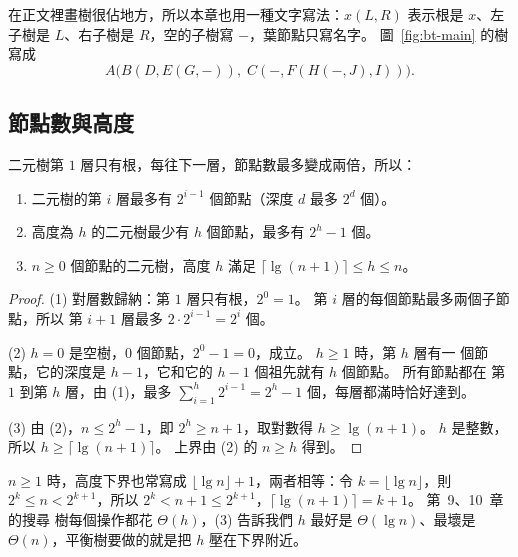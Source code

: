 \begin{center}
\label{fig:bt-main}
\end{center}

在正文裡畫樹很佔地方，所以本章也用一種文字寫法：$x(L, R)$ 表示根是 $x$、左子樹是
$L$、右子樹是 $R$，空的子樹寫 $-$，葉節點只寫名字。 圖~\ref{fig:bt-main} 的樹寫成
\[
A\bigl(B(D, E(G, -)),\; C(-, F(H(-, J), I))\bigr).
\]

\subsection{節點數與高度}

二元樹第 $1$ 層只有根，每往下一層，節點數最多變成兩倍，所以：

\begin{theorem}
\label{thm:bt-count}
\begin{enumerate}
\item 二元樹的第 $i$ 層最多有 $2^{i-1}$ 個節點（深度 $d$ 最多 $2^d$ 個）。
\item 高度為 $h$ 的二元樹最少有 $h$ 個節點，最多有 $2^h - 1$ 個。
\item $n \ge 0$ 個節點的二元樹，高度 $h$ 滿足
$\lceil \lg(n + 1) \rceil \le h \le n$。
\end{enumerate}
\end{theorem}

\begin{proof}
(1) 對層數歸納：第 $1$ 層只有根，$2^0 = 1$。 第 $i$ 層的每個節點最多兩個子節點，所以
第 $i + 1$ 層最多 $2 \cdot 2^{i-1} = 2^i$ 個。

(2) $h = 0$ 是空樹，$0$ 個節點，$2^0 - 1 = 0$，成立。 $h \ge 1$ 時，第 $h$ 層有一
個節點，它的深度是 $h - 1$，它和它的 $h - 1$ 個祖先就有 $h$ 個節點。 所有節點都在
第 $1$ 到第 $h$ 層，由 (1)，最多
$\sum_{i=1}^{h} 2^{i-1} = 2^h - 1$ 個，每層都滿時恰好達到。

(3) 由 (2)，$n \le 2^h - 1$，即 $2^h \ge n + 1$，取對數得 $h \ge \lg(n + 1)$。 $h$
是整數，所以 $h \ge \lceil \lg(n + 1) \rceil$。 上界由 (2) 的 $n \ge h$ 得到。
\end{proof}

$n \ge 1$ 時，高度下界也常寫成 $\lfloor \lg n \rfloor + 1$，兩者相等：令
$k = \lfloor \lg n \rfloor$，則 $2^k \le n < 2^{k+1}$，所以
$2^k < n + 1 \le 2^{k+1}$，$\lceil \lg(n + 1) \rceil = k + 1$。 第~9、10~章的搜尋
樹每個操作都花 $\Theta(h)$，(3) 告訴我們 $h$ 最好是 $\Theta(\lg n)$、最壞是
$\Theta(n)$，平衡樹要做的就是把 $h$ 壓在下界附近。

